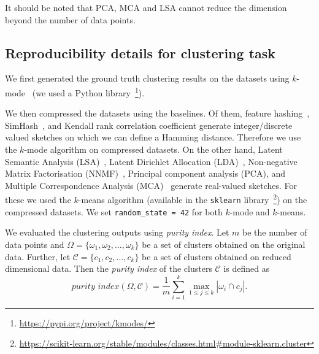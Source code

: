 It should be noted that PCA, MCA and LSA cannot reduce the dimension beyond the number of data points.



\subsection{Reproducibility details for clustering task}\label{appendix:clustering}
    We first generated the ground truth clustering results on the datasets using $k$-mode~\cite{kmode} (we used a Python library~\footnote{\url{https://pypi.org/project/kmodes/}}).
    
    We then compressed the datasets using the baselines. Of them, {feature hashing}~\cite{WeinbergerDLSA09}, {SimHash}~\cite{simhash}, and {Kendall rank correlation coefficient}\cite{kendall1938measure} generate integer/discrete valued  sketches on which we can define a Hamming distance. Therefore we use the $k$-mode algorithm on compressed datasets. On the other hand, {Latent Semantic Analysis (LSA)}~\cite{LSI}, {Latent Dirichlet Allocation (LDA)}~\cite{LDA}, {Non-negative Matrix Factorisation (NNMF)}~\cite{NNMF},  {Principal component analysis (PCA)}, and {Multiple Correspondence Analysis (MCA)}~\cite{MCA} generate real-valued sketches. For these we used the $k$-means algorithm (available in the \texttt{sklearn} library~\footnote{\url{https://scikit-learn.org/stable/modules/classes.html\#module-sklearn.cluster}}) on the compressed datasets. We set \texttt{random\_state = 42} for both $k$-mode and $k$-means.
    
    We evaluated the clustering outputs using {\em purity index}. Let $m$ be the number of data points and $\Omega=\{\omega_1, \omega_2,\ldots, \omega_k\}$ be a set of 
   clusters obtained on the original data. Further, let $\mathcal{C}=\{c_1, c_2,\ldots, c_k\}$ be a set of 
   clusters obtained on reduced dimensional data. Then the \textit{purity index} of the clusters $\mathcal{C}$ is defined as
 $$
   \textit{purity index}(\Omega, \mathcal{C})=\frac{1}{m}\sum_{i=1}^k \max_{1\leq j\leq k}|\omega_i \cap  c_j|.
  $$
  
